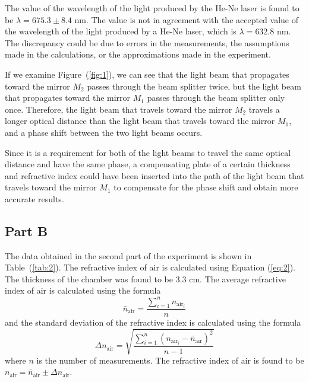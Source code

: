 \documentclass[10pt]{article}
\begin{document}
The value of the wavelength of the light produced by the He-Ne laser is found to be $\lambda = 675.3 \pm 8.4$ nm. The value is not in agreement with the accepted value of the wavelength of the light produced by a He-Ne laser, which is $\lambda = 632.8$ nm. The discrepancy could be due to errors in the measurements, the assumptions made in the calculations, or the approximations made in the experiment.

If we examine Figure~(\ref{fig:1}), we can see that the light beam that propagates toward the mirror $M_2$ passes through the beam splitter twice, but the light beam that propagates toward the mirror $M_1$ passes through the beam splitter only once. Therefore, the light beam that travels toward the mirror $M_2$ travels a longer optical distance than the light beam that travels toward the mirror $M_1$, and a phase shift between the two light beams occurs.

Since it is a requirement for both of the light beams to travel the same optical distance and have the same phase, a compensating plate of a certain thickness and refractive index could have been inserted into the path of the light beam that travels toward the mirror $M_1$ to compensate for the phase shift and obtain more accurate results.

\subsection*{Part B}

The data obtained in the second part of the experiment is shown in Table~(\ref{tab:2}). The refractive index of air is calculated using Equation (\ref{eq:2}). The thickness of the chamber was found to be $3.3$ cm. The average refractive index of air is calculated using the formula
\begin{equation}
  \bar{n}_{\text{air}} = \dfrac{\sum_{i=1}^{n} n_{\text{air}_i}}{n}
  \label{eq:5}
\end{equation}
and the standard deviation of the refractive index is calculated using the formula
\begin{equation}
  \Delta n_{\text{air}} = \sqrt{\dfrac{\sum_{i=1}^{n} \left(n_{\text{air}_i} - \bar{n}_{\text{air}}\right)^2}{n-1}}
  \label{eq:6}
\end{equation}
where $n$ is the number of measurements. The refractive index of air is found to be $n_{\text{air}} = \bar{n}_{\text{air}} \pm \Delta n_{\text{air}}$.
\end{document}
